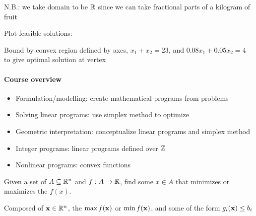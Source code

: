 \begin{sol}
  N.B.: we take domain to be $\mathbb{R}$ since we can take fractional parts of a kilogram of fruit

  Plot feasible solutions:
  \begin{center}
  \end{center}
  Bound by convex region defined by axes, $x_1 + x_2 = 23$,
  and $0.08x_1 + 0.05x_2 = 4$ to give optimal solution at vertex
\end{sol}

\paragraph{Course overview}
\begin{itemize}[nosep]
  \item Formulation/modelling: create mathematical programs from problems
  \item Solving linear programs: use simplex method to optimize
  \item Geometric interpretation: conceptualize linear programs and simplex method
  \item Integer programs: linear programs defined over $\mathbb{Z}$
  \item Nonlinear programs: convex functions
\end{itemize}

\begin{defn}
  Given a set of  $A \subseteq \mathbb{R}^n$ and $f : A \to \mathbb{R}$,
  find some $x \in A$ that minimizes or maximizes the  $f(x)$.

  Composed of  $\vb x \in \mathbb{R}^n$,
  the  $\max f(\vb x)$ or $\min f(\vb x)$,
  and some  of the form $g_i(\vb x) \leq b_i$
\end{defn}

